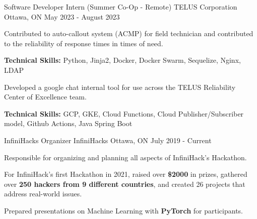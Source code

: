 

\begin{cventries}

  \cventry
    {Software Developer Intern (Summer Co-Op - Remote)} %
    {TELUS Corporation} %
    {Ottawa, ON} %
    {May 2023 - August 2023} %
    {
      \begin{cvitems} %
        \item {Contributed to auto-callout system (ACMP) for field technician and contributed to the reliability of response times in times of need.}
          \item[] {\textbf{Technical Skills:} Python, Jinja2, Docker, Docker Swarm, Sequelize, Nginx, LDAP}
        \item {Developed a google chat internal tool for use across the TELUS Reliability Center of Excellence team.}
          \item[] {\textbf{Technical Skills:} GCP, GKE, Cloud Functions, Cloud Publisher/Subscriber model, Github Actions, Java Spring Boot}
      \end{cvitems}
    }

  \cventry
    {InfiniHacks Organizer} %
    {InfiniHacks} %
    {Ottawa, ON} %
    {July 2019 - Current} %
    {
      \begin{cvitems} %
        \item {Responsible for organizing and planning all aspects of InfiniHack's Hackathon.}
        \item {For InfiniHack's first Hackathon in 2021, raised over \textbf{\$2000} in prizes, gathered over \textbf{250 hackers from 9 different countries}, and created 26 projects that address real-world issues.}
        \item {Prepared presentations on Machine Learning with \textbf{PyTorch} for participants.}
      \end{cvitems}
    }


\end{cventries}
